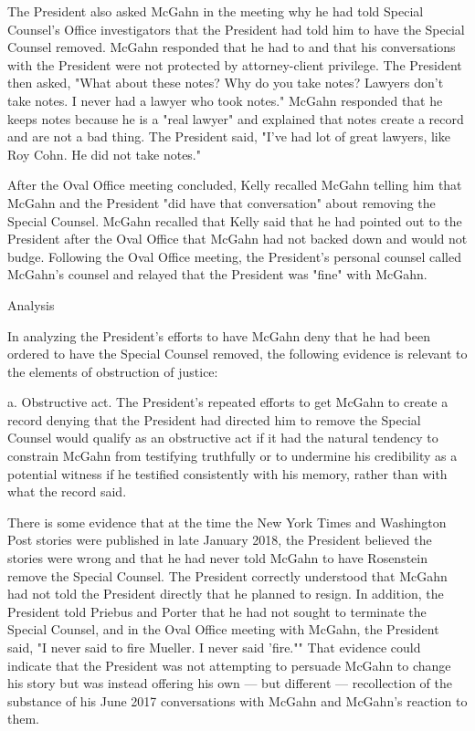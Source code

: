 The President also asked McGahn in the meeting why he had told Special Counsel's Office investigators that the President had told him to have the Special Counsel removed.%
McGahn responded that he had to and that his conversations with the President were not protected by attorney-client privilege.%
The President then asked, "What about these notes? Why do you take notes? Lawyers don't take notes.
I never had a lawyer who took notes."%
McGahn responded that he keeps notes because he is a "real lawyer" and explained that notes create a record and are not a bad thing.%
The President said, "I've had lot of great lawyers, like Roy Cohn.
He did not take notes."%

After the Oval Office meeting concluded, Kelly recalled McGahn telling him that McGahn and the President "did have that conversation" about removing the Special Counsel.%
McGahn recalled that Kelly said that he had pointed out to the President after the Oval Office that McGahn had not backed down and would not budge.%
Following the Oval Office meeting, the President's personal counsel called McGahn's counsel and relayed that the President was "fine" with McGahn.%

Analysis

In analyzing the President's efforts to have McGahn deny that he had been ordered to have the Special Counsel removed, the following evidence is relevant to the elements of obstruction of justice:

a. Obstructive act.
The President's repeated efforts to get McGahn to create a record denying that the President had directed him to remove the Special Counsel would qualify as an obstructive act if it had the natural tendency to constrain McGahn from testifying truthfully or to undermine his credibility as a potential witness if he testified consistently with his memory, rather than with what the record said.

There is some evidence that at the time the New York Times and Washington Post stories were published in late January 2018, the President believed the stories were wrong and that he had never told McGahn to have Rosenstein remove the Special Counsel.
The President correctly understood that McGahn had not told the President directly that he planned to resign.
In addition, the President told Priebus and Porter that he had not sought to terminate the Special Counsel, and in the Oval Office meeting with McGahn, the President said, "I never said to fire Mueller.
I never said 'fire.""
That evidence could indicate that the President was not attempting to persuade McGahn to change his story but was instead offering his own — but different — recollection of the substance of his June 2017 conversations with McGahn and McGahn's reaction to them.

